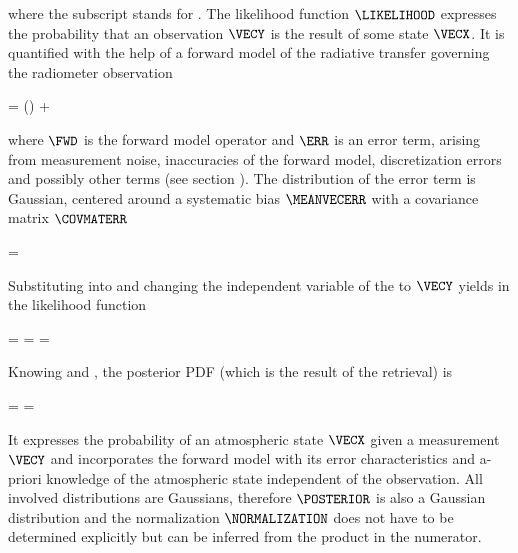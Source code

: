     where the subscript  stands for . The likelihood
    function $\LIKELIHOOD$ expresses the probability that an observation
    $\VECY$ is the result of some state $\VECX$. It is quantified with the help
    of a forward model of the radiative transfer governing the radiometer
    observation

    \startformula
        \VECY = \FWD(\VECX) + \ERR \EQCOMMA
    \stopformula

    where $\FWD$ is the forward model operator and $\ERR$ is an error term,
    arising from measurement noise, inaccuracies of the forward model,
    discretization errors and possibly other terms (see section
    ). The distribution of the error term is Gaussian,
    centered around a systematic bias $\MEANVECERR$ with a covariance matrix
    $\COVMATERR$

    \startformula
        \PROB{\ERR} = \GAUSS{\ERR}{\MEANVECERR}{\COVMATERR} \EQSTOP
    \stopformula

    Substituting  into  and
    changing the independent variable of the {\PDF} to $\VECY$ yields in the
    likelihood function
    
    \placesubformula
    \startformula
    \startalign[n=3,align={right,middle,left}]
        \NC \PROB{\VECY - \FWD(\VECX)} = \NC
            \GAUSS{\VECY - \FWD(\VECX)}{\MEANVECERR}{\COVMATERR} \NC \NR
        \NC = \NC \GAUSS{\VECY}{\FWD(\VECX)+\MEANVECERR}{\COVMATERR} \NC
            = \LIKELIHOOD \EQSTOP {}
    \stopalign
    \stopformula

    Knowing  and , the
    posterior PDF (which is the result of the retrieval) is

    \startformula
        \POSTERIOR
        = \frac{\LIKELIHOOD \PRIOR}{\NORMALIZATION}
        = \frac{\GAUSS{\VECY}{\FWD(\VECX) + \MEANVECERR}{\COVMATERR}
            ~\GAUSS{\VECX}{\MEANVECA}{\COVMATA}}{\NORMALIZATION} \EQSTOP
    \stopformula

    It expresses the probability of an atmospheric state $\VECX$ given a
    measurement $\VECY$ and incorporates the forward model with its error
    characteristics and a-priori knowledge of the atmospheric state independent
    of the observation. All involved distributions are Gaussians, therefore
    $\POSTERIOR$ is also a Gaussian distribution and the normalization
    $\NORMALIZATION$ does not have to be determined explicitly
    but can be inferred from the product in the numerator.

